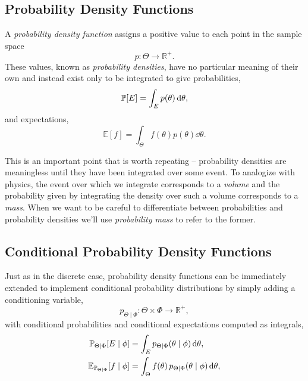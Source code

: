 \subsection{Probability Density Functions}

A \emph{probability density function} assigns a positive value to each
point in the sample space
%
\begin{equation*}
p : \Theta \rightarrow \mathbb{R}^{+}.
\end{equation*}
%
These values, known as \emph{probability densities}, have no particular 
meaning of their own and instead exist only to be integrated to give 
probabilities,
%
\begin{equation*}
\mathbb{P} \! \left[ E \right]
=
\int_{E} p \! \left( \theta \right) \mathrm{d} \theta,
\end{equation*}
%
and expectations,
%
\begin{equation*}
\mathbb{E} \! \left[ f \right]
=
\int_{\Theta} f \! \left( \theta \right) p \! \left( \theta \right) \dd \theta.
\end{equation*}

This is an important point that is worth repeating -- probability densities 
are meaningless until they have been integrated over some event.  To 
analogize with physics, the event over which we integrate corresponds 
to a \emph{volume} and the probability given by integrating the density 
over such a volume corresponds to a \emph{mass}.  When we want to 
be careful to differentiate between probabilities and probability densities 
we'll use \emph{probability mass} to refer to the former.

\subsection{Conditional Probability Density Functions}

Just as in the discrete case, probability density functions can be immediately
extended to implement conditional probability distributions by simply adding a 
conditioning variable,
%
\begin{equation*}
p_{\Theta \mid \Phi} : \Theta \times \Phi \rightarrow \mathbb{R}^{+},
\end{equation*}
%
with conditional probabilities and conditional expectations computed
as integrals,
%
\begin{align*}
\mathbb{P}_{\Theta \mid \Phi}  \! \left[ E \mid \phi \right]
&=
\int_{E} p_{\Theta \mid \Phi}  \! \left( \theta \mid \phi \right) \mathrm{d} \theta,
\\
\mathbb{E}_{\mathbb{P}_{\Theta \mid \Phi} } \! \left[ f \mid \phi \right]
&=
\int_{\Theta} f \! \left( \theta \right) 
p_{\Theta \mid \Phi}  \! \left( \theta \mid \phi \right) \mathrm{d} \theta,
\end{align*}

